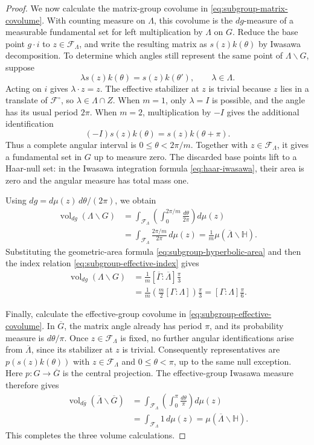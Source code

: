 \begin{proof}
We now calculate the matrix-group covolume in \eqref{eq:subgroup-matrix-covolume}. With counting measure on $\Lambda$, this covolume is the $dg$-measure of a measurable fundamental set for left multiplication by $\Lambda$ on $G$. Reduce the base point $g\cdot i$ to $z\in\mathcal F_\Lambda$, and write the resulting matrix as $s(z)k(\theta)$ by Iwasawa decomposition. To determine which angles still represent the same point of $\Lambda\backslash G$, suppose
\[
 \lambda s(z)k(\theta)=s(z)k(\theta'),\qquad\lambda\in\Lambda.
\]
Acting on $i$ gives $\lambda\cdot z=z$. The effective stabilizer at $z$ is trivial because $z$ lies in a translate of $\mathcal F^\circ$, so $\lambda\in\Lambda\cap Z$. When $m=1$, only $\lambda=I$ is possible, and the angle has its usual period $2\pi$. When $m=2$, multiplication by $-I$ gives the additional identification
\[
 (-I)s(z)k(\theta)=s(z)k(\theta+\pi).
\]
Thus a complete angular interval is $0\leq\theta<2\pi/m$. Together with $z\in\mathcal F_\Lambda$, it gives a fundamental set in $G$ up to measure zero. The discarded base points lift to a Haar-null set: in the Iwasawa integration formula \eqref{eq:haar-iwasawa}, their area is zero and the angular measure has total mass one.

Using $dg=d\mu(z)\,d\theta/(2\pi)$, we obtain
\[
 \begin{aligned}
 \operatorname{vol}_{dg}(\Lambda\backslash G)
 &=\int_{\mathcal F_\Lambda}
      \left(\int_0^{2\pi/m}\frac{d\theta}{2\pi}\right)d\mu(z)\\
 &=\int_{\mathcal F_\Lambda}
      \frac{2\pi/m}{2\pi}\,d\mu(z)
 =\frac1m\mu(\overline\Lambda\backslash\mathbb H).
 \end{aligned}
\]
Substituting the geometric-area formula \eqref{eq:subgroup-hyperbolic-area} and then the index relation \eqref{eq:subgroup-effective-index} gives
\[
 \begin{aligned}
 \operatorname{vol}_{dg}(\Lambda\backslash G)
 &=\frac1m[\overline\Gamma:\overline\Lambda]\frac\pi3\\
 &=\frac1m\left(\frac m2[\Gamma:\Lambda]\right)\frac\pi3
 =[\Gamma:\Lambda]\frac\pi6.
 \end{aligned}
\]

Finally, calculate the effective-group covolume in \eqref{eq:subgroup-effective-covolume}. In $\overline G$, the matrix angle already has period $\pi$, and its probability measure is $d\theta/\pi$. Once $z\in\mathcal F_\Lambda$ is fixed, no further angular identifications arise from $\overline\Lambda$, since its stabilizer at $z$ is trivial. Consequently representatives are $p(s(z)k(\theta))$ with $z\in\mathcal F_\Lambda$ and $0\leq\theta<\pi$, up to the same null exception. Here $p:G\to\overline G$ is the central projection. The effective-group Iwasawa measure therefore gives
\[
 \begin{aligned}
 \operatorname{vol}_{d\overline g}(\overline\Lambda\backslash\overline G)
 &=\int_{\mathcal F_\Lambda}
      \left(\int_0^\pi\frac{d\theta}{\pi}\right)d\mu(z)\\
 &=\int_{\mathcal F_\Lambda}1\,d\mu(z)
 =\mu(\overline\Lambda\backslash\mathbb H).
 \end{aligned}
\]
This completes the three volume calculations.
\end{proof}

